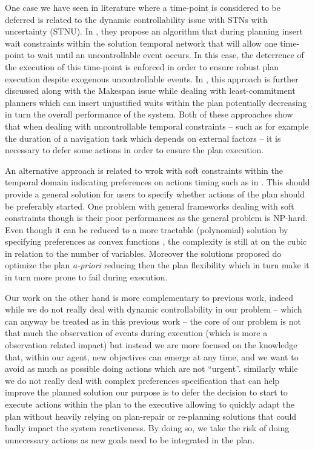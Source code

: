 One case we have seen in literature where a time-point is
considered to be deferred is related to the dynamic controllability
issue with STNs with uncertainty (STNU). In \cite{morris01}, they propose 
an algorithm that during planning insert wait constraints within the
solution temporal network that will allow one time-point to wait until
an uncontrollable event occurs. In this case, the deterrence of the
execution of this time-point is enforced in order to ensure robust plan
execution despite exogenous uncontrollable events. In
\cite{gallien2006},  this approach is further discussed along with the
Makespan issue while dealing with least-commitment planners which can
insert unjustified waits within the plan potentially decreasing in turn the
overall performance of the system. Both of these approaches show that
when dealing with uncontrollable temporal constraints -- such as for
example the duration of a navigation task which depends on external
factors -- it is necessary to defer some actions in order to ensure
the plan execution. 

An alternative approach is related to wrok with soft constraints
within the temporal domain indicating preferences on actions timing
such as in \cite{khatib2001temporal}. This should provide  a general
solution for users to specify whether actions of the plan should be
preferably started. One problem with general frameworks dealing with
soft constraints though is their poor performances \cite{bartak2002}
as the general problem is NP-hard. Even though it can be reduced to a
more tractable (polynomial) solution by specifying preferences as
convex functions \cite{rossi2006learning}, the  
complexity is still at on the cubic in relation to the number of
variables. Moreover the solutions proposed do optimize the plan {\em
  a-priori} reducing then the plan flexibility which in turn make it
in  turn more prone to fail during execution.

Our work on the other hand is more complementary to previous work, indeed
while we do not really deal with dynamic controllability in our
problem -- which can anyway be treated as in this previous work -- the
core of our problem is not that much the observation of events during
execution (which is more a observation related impact) but instead we
are more focused on the knowledge that, within our agent, new
objectives can emerge at any time, and we want to avoid as much as
possible doing actions which are not ``urgent''. similarly while we do
not really deal with complex preferences specification that can help
improve the planned solution our purpose is to defer the decision to
start to execute actions within the plan to the executive allowing to
quickly adapt the plan without heavily relying on plan-repair or
re-planning solutions that could badly impact the system reactiveness.
By doing so, we take the risk of doing unnecessary actions as new
goals need to be integrated in the plan.

